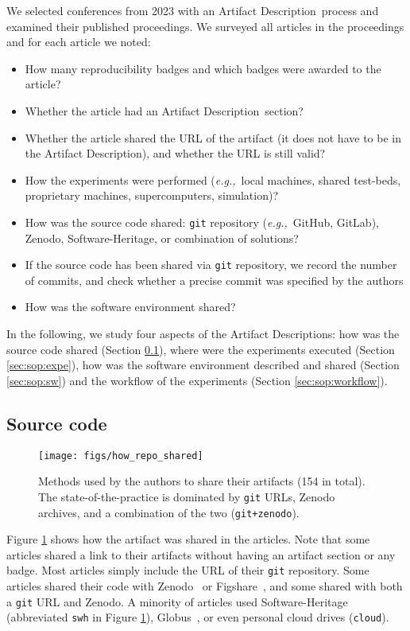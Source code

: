 \documentclass[sigconf,natbib=false]{acmart}
\newcommand{\eg}{\emph{e.g.,}}
\newcommand{\ad}{Artifact Description}
\begin{document}
We selected conferences from 2023 with an \ad\ process and examined their published proceedings.
We surveyed all articles in the proceedings and for each article we noted:

\begin{itemize}
  \item How many reproducibility badges and which badges were awarded to the article?
  \item Whether the article had an \ad\ section?
  \item Whether the article shared the URL of the artifact (it does not have to be in the \ad), and whether the URL is still valid?
  \item How the experiments were performed (\eg\ local machines, shared test-beds, proprietary machines, supercomputers, simulation)?
  \item How was the source code shared: \texttt{git} repository (\eg\ GitHub, GitLab), Zenodo, Software-Heritage, or combination of solutions?
  \item If the source code has been shared via \texttt{git} repository, we record the number of commits, and check whether a precise commit was specified by the authors
  \item How was the software environment shared?
\end{itemize}

In the following, we study four aspects of the \ad s: how was the source code shared (Section \ref{sec:sop:src}), where were the experiments executed (Section \ref{sec:sop:expe}), how was the software environment described and shared (Section \ref{sec:sop:sw}) and the workflow of the experiments (Section \ref{sec:sop:workflow}).

\subsection{Source code}\label{sec:sop:src}

\begin{figure}
  \centering
  \texttt{[image: figs/how\_repo\_shared]}
  \caption{Methods used by the authors to share their artifacts (154 in total).
  The state-of-the-practice is dominated by \texttt{git} URLs, Zenodo archives, and a combination of the two (\texttt{git+zenodo}).}\label{fig:how_repo_shared}
\end{figure}

Figure \ref{fig:how_repo_shared} shows how the artifact was shared in the articles.
Note that some articles shared a link to their artifacts without having an artifact section or any badge.
Most articles simply include the URL of their \texttt{git} repository.
Some articles shared their code with Zenodo\ \cite{zenodo} or Figshare\ \cite{figshare}, and some shared with both a \texttt{git} URL and Zenodo.
A minority of articles used Software-Heritage\ \cite{swheritage} (abbreviated \texttt{swh} in Figure \ref{fig:how_repo_shared}), Globus\ \cite{globus}, or even personal cloud drives (\texttt{cloud}).
\end{document}
